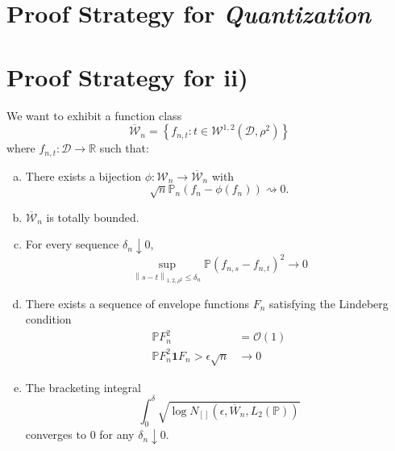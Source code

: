 \documentclass{article}
\newcommand{\Reals}{\mathbb{R}}
\newcommand{\norm}[1]{\left\lVert#1\right\rVert}
\newcommand{\set}[1]{\left\{#1\right\}}
\newcommand{\Dset}{\mathcal{D}}
\newcommand{\Wset}{\mathcal{W}}
\newcommand{\Pbb}{\mathbb{P}}
\newcommand{\1}{\mathbf{1}}
\theoremstyle{alden}
\theoremstyle{aldenthm}
\theoremstyle{remark}
\begin{document}
\section{Proof Strategy for \emph{Quantization}}

\section{Proof Strategy for ii)}

We want to exhibit a function class
\begin{equation*}
\overline{\Wset}_n = \set{f_{n,t}: t \in \Wset^{1,2}(\Dset,\rho^2)}
\end{equation*}
where $f_{n,t}: \Dset \to \Reals$ such that:  
\begin{enumerate}[(a)]
	\item 
	There exists a bijection $\phi: \Wset_n \to \overline{\Wset}_n$ with
	\begin{equation*}
	\sqrt{n}\Pbb_n(f_n - \phi(f_n)) \rightsquigarrow 0.
	\end{equation*}
	\item 
	$\overline{\Wset}_n$ is totally bounded.
	\item
	For every sequence $\delta_n \downarrow 0$,
	\begin{equation*}
	\sup_{\norm{s - t}_{1,2,\rho^2} \leq \delta_n} \Pbb(f_{n,s} - f_{n,t})^2 \to 0
	\end{equation*}
	\item
	There exists a sequence of envelope functions $F_n$ satisfying the Lindeberg condition
	\begin{align*}
	\Pbb F_n^2 & = \mathcal{O}(1) \\
	\Pbb F_n^2 \1{F_n > \epsilon \sqrt{n}} & \to 0 \tag{for any $\epsilon > 0$}
	\end{align*}
	\item The bracketing integral
	\begin{equation*}
	\int_{0}^{\delta} \sqrt{\log N_{[]}(\epsilon, \overline{W}_n, L_2(\Pbb))}
	\end{equation*}
	converges to $0$ for any $\delta_n \downarrow 0$.
\end{enumerate}
\end{document}
